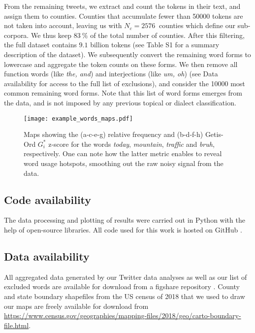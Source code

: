 \documentclass[../thesis.tex]{subfiles}
\begin{document}
From the remaining tweets, we extract and count the tokens in their text, and assign
them to counties. Counties that accumulate fewer than \SI{50000}{} tokens are not taken
into account, leaving us with $N_c = \SI{2576}{}$ counties which define our sub-corpora.
We thus keep $\SI{83}{\percent}$ of the total number of counties. After this filtering,
the full dataset contains $9.1$ billion tokens (see Table S1 for a summary description
of the dataset). We subsequently convert the remaining word forms to lowercase and
aggregate the token counts on these forms. We then remove all function words (like
\textit{the, and}) and interjections (like \textit{um, oh}) (see Data availability for
access to the full list of exclusions), and consider the \SI{10000}{} most common
remaining word forms. Note that this list of word forms emerges from the data, and is
not imposed by any previous topical or dialect classification.

\begin{figure}[hpt!]
\centering %
  \texttt{[image: example\_words\_maps.pdf]}
  \caption{Maps showing the (a-c-e-g) relative frequency and (b-d-f-h) Getis-Ord
  $G_i^*$ z-score for the words \textit{today}, \textit{mountain}, \textit{traffic} and
  \textit{bruh}, respectively. One can note how the latter metric enables to reveal word
  usage hotspots, smoothing out the raw noisy signal from the data.}
  \label{fig:example_words_maps}
\end{figure}

\subsection{Code availability}
The data processing and plotting of results were carried out in Python with the help of
open-source libraries. All code used for this work is hosted on GitHub
\cite{LoufWordsuse2023}.

\subsection{Data availability}
All aggregated data generated by our Twitter data analyses as well as our list of
excluded words are available for download from a figshare repository
\cite{LoufThomasWordCounts2023}. County and state boundary shapefiles from the US census
of 2018 that we used to draw our maps are freely available for download from
\url{https://www.census.gov/geographies/mapping-files/2018/geo/carto-boundary-file.html}.
\end{document}

